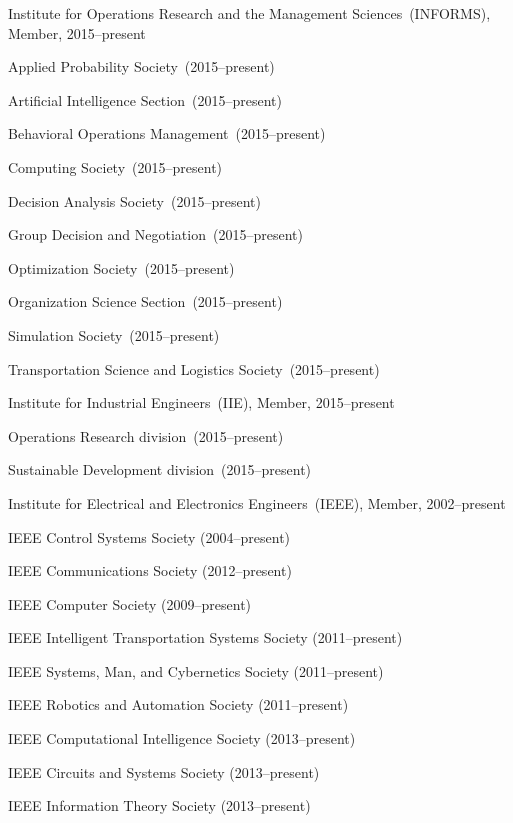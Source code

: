\documentclass[10pt]{article}           %
\newcommand{\halfblankline}{\quad\vspace{-0.5\baselineskip}\pagebreak[3]}
\begin{document}
Institute for Operations Research and the Management Sciences~(INFORMS), Member, 2015--present
%
\begin{cvlist}
    \item Applied Probability Society~(2015--present)
    \item Artificial Intelligence Section~(2015--present)
    \item Behavioral Operations Management~(2015--present)
    \item Computing Society~(2015--present)
    \item Decision Analysis Society~(2015--present)
    \item Group Decision and Negotiation~(2015--present)
    \item Optimization Society~(2015--present)
    \item Organization Science Section~(2015--present)
    \item Simulation Society~(2015--present)
    \item Transportation Science and Logistics Society~(2015--present)
\end{cvlist}

\halfblankline

Institute for Industrial Engineers~(IIE), Member, 2015--present
%
\begin{cvlist}
    \item Operations Research division~(2015--present)
    \item Sustainable Development division~(2015--present)
\end{cvlist}

\halfblankline

Institute for Electrical and Electronics Engineers~(IEEE), Member,
2002--present
%
\begin{cvlist}
    \item IEEE Control Systems Society (2004--present)
    \item IEEE Communications Society (2012--present)
    \item IEEE Computer Society (2009--present)
    \item IEEE Intelligent Transportation Systems Society (2011--present)
    \item IEEE Systems, Man, and Cybernetics Society (2011--present)
    \item IEEE Robotics and Automation Society (2011--present)
    \item IEEE Computational Intelligence Society (2013--present)
    \item IEEE Circuits and Systems Society (2013--present)
    \item IEEE Information Theory Society (2013--present)
\end{cvlist}
\end{document}
